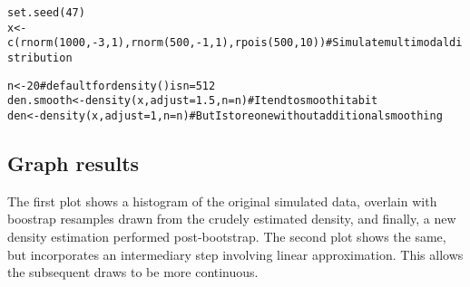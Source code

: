 \documentclass{article}\usepackage[]{graphicx}\usepackage[]{color}
\makeatletter
\newcommand{\hlnum}[1]{\textcolor[rgb]{0.863,0.196,0.184}{#1}}%
\newcommand{\hlcom}[1]{\textcolor[rgb]{0.345,0.431,0.459}{#1}}%
\newcommand{\hlopt}[1]{\textcolor[rgb]{0.576,0.631,0.631}{#1}}%
\newcommand{\hlstd}[1]{\textcolor[rgb]{0.514,0.58,0.588}{#1}}%
\newcommand{\hlkwb}[1]{\textcolor[rgb]{0.522,0.6,0}{#1}}%
\newcommand{\hlkwc}[1]{\textcolor[rgb]{0.796,0.294,0.086}{#1}}%
\newcommand{\hlkwd}[1]{\textcolor[rgb]{0.576,0.631,0.631}{#1}}%
\newenvironment{kframe}{%
 \def\at@end@of@kframe{}%
 \ifinner\ifhmode%
  \def\at@end@of@kframe{\end{minipage}}%
  \begin{minipage}{\columnwidth}%
 \fi\fi%
 \def\FrameCommand##1{\hskip\@totalleftmargin \hskip-\fboxsep
 \colorbox{shadecolor}{##1}\hskip-\fboxsep
     \hskip-\linewidth \hskip-\@totalleftmargin \hskip\columnwidth}%
 \MakeFramed {\advance\hsize-\width
   \@totalleftmargin\z@ \linewidth\hsize
   \@setminipage}}%
 {\par\unskip\endMakeFramed%
 \at@end@of@kframe}
\newenvironment{knitrout}{}{} %
\makeatother
\begin{document}
\begin{knitrout}
\color{fgcolor}\begin{kframe}
\begin{alltt}
\hlkwd{set.seed}\hlstd{(}\hlnum{47}\hlstd{)}
\hlstd{x} \hlkwb{<-} \hlkwd{c}\hlstd{(}\hlkwd{rnorm}\hlstd{(}\hlnum{1000}\hlstd{,} \hlopt{-}\hlnum{3}\hlstd{,} \hlnum{1}\hlstd{),} \hlkwd{rnorm}\hlstd{(}\hlnum{500}\hlstd{,} \hlopt{-}\hlnum{1}\hlstd{,} \hlnum{1}\hlstd{),} \hlkwd{rpois}\hlstd{(}\hlnum{500}\hlstd{,} \hlnum{10}\hlstd{))}  \hlcom{# Simulate multimodal distribution}

\hlstd{n} \hlkwb{<-} \hlnum{20}  \hlcom{# default for density() is n=512}
\hlstd{den.smooth} \hlkwb{<-} \hlkwd{density}\hlstd{(x,} \hlkwc{adjust} \hlstd{=} \hlnum{1.5}\hlstd{,} \hlkwc{n} \hlstd{= n)}  \hlcom{# I tend to smooth it a bit}
\hlstd{den} \hlkwb{<-} \hlkwd{density}\hlstd{(x,} \hlkwc{adjust} \hlstd{=} \hlnum{1}\hlstd{,} \hlkwc{n} \hlstd{= n)}  \hlcom{# But I store one without additional smoothing}
\end{alltt}
\end{kframe}
\end{knitrout}

\subsection{Graph results}
The first plot shows a histogram of the original simulated data, overlain with boostrap resamples drawn from the crudely estimated density, and finally, a new density estimation performed post-bootstrap.
The second plot shows the same, but incorporates an intermediary step involving linear approximation.
This allows the subsequent draws to be more continuous.
\end{document}
